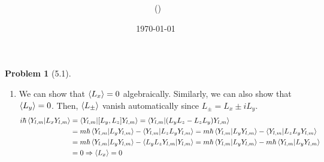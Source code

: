 \documentclass[twoside,11pt]{article}
\title{{\lms \Code \ \Ass}}
\author{\lms \name \ (\href{mailto:\mail}{\mail})}
\date{\sffamily \today}
\makeatletter
\theoremstyle{definition}
\newtheorem{problem}{Problem}
\theoremstyle{remark}
\newtheorem*{remark}{Remark}
\renewcommand{\maketitle}{\bgroup\setlength{\parindent}{0pt}
\begin{flushleft}
  \textbf{\Large\@title}

  \@author
\end{flushleft}\egroup
}
\makeatother
\begin{document}
\maketitle
\thispagestyle{title}


\begin{problem}[5.1]\
\begin{enumerate}[label=(\alph*)]
    \item We can show that $\braket{L_x}=0$ algebraically.
    Similarly, we can also show that $\braket{L_y}=0$.
    Then, $\braket{L_{\pm}}$ vanish automatically since $L_{\pm} = L_x \pm i L_y$.
    \begin{align*}
        i\hbar\braket{Y_{l,m}|L_xY_{l,m}}
        &= \braket{Y_{l,m}|[L_y, L_z]Y_{l,m}}
        = \braket{Y_{l,m}|(L_yL_z-L_zL_y)Y_{l,m}} \\
        &= m\hbar \braket{Y_{l,m}|L_y Y_{l,m}} - \braket{Y_{l,m}|L_zL_yY_{l,m}}
        = m\hbar \braket{Y_{l,m}|L_y Y_{l,m}} - \braket{Y_{l,m}|L_zL_yY_{l,m}}\\
        &= m\hbar \braket{Y_{l,m}|L_yY_{l,m}} - \braket{L_yL_zY_{l,m}|Y_{l,m}}
        = m\hbar \braket{Y_{l,m}|L_yY_{l,m}} - m\hbar \braket{Y_{l,m}|L_yY_{l,m}}\\
        &= 0\Rightarrow \braket{L_x}=0
    \end{align*}


\end{enumerate}
\end{problem}
\end{document}
